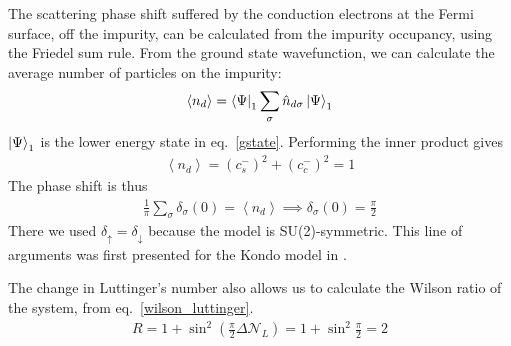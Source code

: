 \documentclass{report}
\numberwithin{equation}{section}
\begin{document}
The scattering phase shift suffered by the conduction electrons at the Fermi surface, off the impurity, can be calculated from the impurity occupancy, using the Friedel sum rule. From the ground state wavefunction, we can calculate the average number of particles on the impurity:
\begin{equation}\begin{aligned}
	\left<n_d \right> = \bra{\Psi}_1\sum_\sigma \hat n_{d\sigma} \ket{\Psi}_1
\end{aligned}\end{equation}
\(\ket{\Psi}_1\) is the lower energy state in eq.~\eqref{gstate}. Performing the inner product gives
\begin{equation}\begin{aligned}
	\left<n_d \right> = \left( c_s^- \right)^2 + \left( c_c^- \right)^2 = 1
\end{aligned}\end{equation}
The phase shift is thus
\begin{equation}\begin{aligned}
	\frac{1}{\pi}\sum_\sigma \delta_\sigma(0) = \left<n_d \right> \implies \delta_\sigma(0) = \frac{\pi}{2}
\end{aligned}\end{equation}
There we used \(\delta_\uparrow = \delta_\downarrow\) because the model is SU(2)-symmetric. This line of arguments was first presented for the Kondo model in \cite{martin1982fermi}.

The change in Luttinger's number also allows us to calculate the Wilson ratio of the system, from eq.~\eqref{wilson_luttinger}.
\begin{equation}\begin{aligned}
	R = 1 + \sin^2 \left( \frac{\pi}{2}\Delta \mathcal{N}_L \right) = 1 + \sin^2 \frac{\pi}{2} = 2
\end{aligned}\end{equation}
\end{document}
